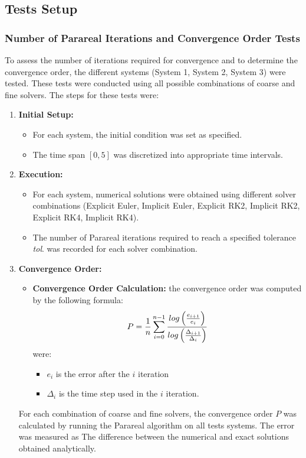 \documentclass[a4paper,12pt,french]{article}
\begin{document}
\subsection{Tests Setup}
\subsubsection{Number of Parareal Iterations and Convergence Order Tests}
To assess the number of iterations required for convergence and to determine the convergence order, the different systems (System 1, System 2, System 3) were tested. These tests were conducted using all possible combinations of coarse and fine solvers.
The steps for these tests were:
\begin{enumerate}
    \item \textbf{Initial Setup:}
        \begin{itemize}
            \item For each system, the initial condition was set as specified.
            \item The time span $[0,5]$ was discretized into appropriate time intervals.
        \end{itemize}
    \item \textbf{Execution:}
        \begin{itemize}
            \item For each system, numerical solutions were obtained using different solver combinations (Explicit Euler, Implicit Euler, Explicit RK2, Implicit RK2, Explicit RK4, Implicit RK4).
            \item The number of Parareal iterations required to reach a specified tolerance \textit{tol}. was recorded for each solver combination.
        \end{itemize}
    \item \textbf{Convergence Order:}
        \begin{itemize}
            \item \textbf{Convergence Order Calculation:}
            the convergence order was computed by the following formula:
            \begin{equation}
                \large
                P = \frac{1}{n} \sum_{i=0}^{n-1} \frac{log\left(\frac{e_{i+1}}{e_i}\right)}{log\left(\frac{\Delta_{i+1}}{\Delta_i}\right)}
            \end{equation}
            were:
            \begin{itemize}
                \item $e_i$  is the error after the $i$ iteration
                \item $\Delta_i$ is the time step used in the $i$ iteration.
            \end{itemize}

        \end{itemize}
        For each combination of coarse and fine solvers, the convergence order $P$ was calculated by running the Parareal algorithm on all tests systems. The error
        was measured as The difference between the numerical and exact solutions obtained analytically.
\end{enumerate}
\end{document}
